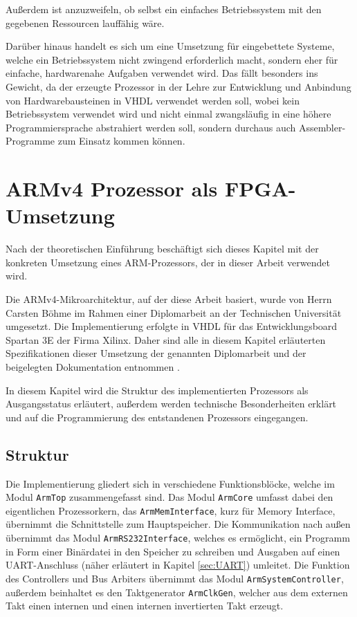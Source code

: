 \documentclass[11pt,a4paper,titlepage]{article}
\begin{document}
Außerdem ist anzuzweifeln, ob selbst ein einfaches Betriebssystem mit den gegebenen Ressourcen lauffähig wäre.

Darüber hinaus handelt es sich um eine Umsetzung für eingebettete Systeme, welche ein Betriebssystem nicht zwingend erforderlich macht, sondern eher für einfache, hardwarenahe Aufgaben verwendet wird. Das fällt besonders ins Gewicht, da der erzeugte Prozessor in der Lehre zur Entwicklung und Anbindung von Hardwarebausteinen in VHDL verwendet werden soll, wobei kein Betriebssystem verwendet wird und nicht einmal zwangsläufig in eine höhere Programmiersprache abstrahiert werden soll, sondern durchaus auch Assembler-Programme zum Einsatz kommen können.

\newpage
\section{ARMv4 Prozessor als FPGA-Umsetzung}

Nach der theoretischen Einführung beschäftigt sich dieses Kapitel mit der konkreten Umsetzung eines ARM-Prozessors, der in dieser Arbeit verwendet wird.

Die ARMv4-Mikroarchitektur, auf der diese Arbeit basiert, wurde von Herrn Carsten Böhme im Rahmen einer Diplomarbeit an der Technischen Universität umgesetzt. Die Implementierung erfolgte in VHDL für das Entwicklungsboard Spartan 3E der Firma Xilinx. Daher sind alle in diesem Kapitel erläuterten Spezifikationen dieser Umsetzung der genannten Diplomarbeit und der beigelegten Dokumentation entnommen \cite{Boehme}.

In diesem Kapitel wird die Struktur des implementierten Prozessors als Ausgangsstatus erläutert, außerdem werden technische Besonderheiten erklärt und auf die Programmierung des entstandenen Prozessors eingegangen.

\subsection{Struktur}

Die Implementierung gliedert sich in verschiedene Funktionsblöcke, welche im Modul \verb+ArmTop+ zusammengefasst sind. Das Modul \verb+ArmCore+ umfasst dabei den eigentlichen Prozessorkern, das \verb+ArmMemInterface+, kurz für Memory Interface, übernimmt die Schnittstelle zum Hauptspeicher. Die Kommunikation nach außen übernimmt das Modul \verb+ArmRS232Interface+, welches es ermöglicht, ein Programm in Form einer Binärdatei in den Speicher zu schreiben und Ausgaben auf einen UART-Anschluss (näher erläutert in Kapitel \ref{sec:UART}) umleitet.
Die Funktion des Controllers und Bus Arbiters übernimmt das Modul \verb+ArmSystemController+, außerdem beinhaltet es den Taktgenerator \verb+ArmClkGen+, welcher aus dem externen Takt einen internen und einen internen invertierten Takt erzeugt.
\end{document}
